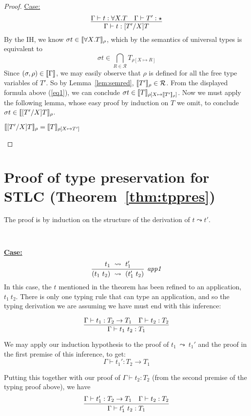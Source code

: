 \documentclass{article}
\providecommand{\apparule}[0]{\infer[\textit{app1}]{(t_1\ t_2)\ \leadsto\ (t_1'\ t_2)}
                                {t_1\ \leadsto\ t_1'}}
\begin{document}
\begin{proof}
\underline{Case:}
\[
\infer{\Gamma \vdash t : [T'/X]T}{\Gamma \vdash t : \forall X.T & \Gamma \vdash T' : \star} 
\]
By the IH, we know $\sigma t\in\llbracket \forall X.T \rrbracket_\rho$, which by the semantics
of universal types is equivalent to
\begin{equation}
\label{eq1}
\sigma t \in \bigcap_{R\in\mathcal{R}} T_{\rho[X\mapsto R]}
\end{equation}
Since $(\sigma,\rho)\in\llbracket \Gamma \rrbracket$, we may easily observe that
$\rho$ is defined for all the free type variables of $T'$.  So by
Lemma~\ref{lem:semred}, $\llbracket T' \rrbracket_\rho\in\mathcal{R}$.  From the
displayed formula above (\ref{eq1}), we can conclude $\sigma t\in
\llbracket T \rrbracket_{\rho[X\mapsto \llbracket T' \rrbracket_\rho]}$.  Now we must apply the
following lemma, whose easy proof by induction on $T$ we omit, to
conclude $\sigma t\in\llbracket [T'/X]T \rrbracket_\rho$.
\begin{lemma}
$\llbracket [T'/X]T \rrbracket_\rho = \llbracket T \rrbracket_{\rho[X\mapsto T']}$
\end{lemma}

\end{proof}




\appendix

\section{Proof of type preservation for STLC (Theorem~\ref{thm:tppres})}
\label{sec:tppres}

The proof is
  by induction on the structure of the derivation of $t \leadsto t'$.  

\ 

\noindent \underline{\textbf{Case:}}
\[
\apparule
\]
\noindent In this case, the $t$ mentioned in the theorem has been
refined to an application, $t_1\ t_2$.  There is only one typing rule that
can type an application, and so the typing derivation we are assuming
we have must end with this inference:

\[
\infer{\Gamma \vdash t_1\ t_2 : T_1}
      {\Gamma \vdash t_1 : T_2 \to T_1 & \Gamma \vdash t_2 : T_2}
\]

\noindent We may apply our induction hypothesis to the proof of $t_1\
\leadsto\ t_1'$ and the proof in the first premise of this inference,
to get:
\[ 
\Gamma \vdash t_1' : T_2\to T_1
\]

\noindent Putting this together with our proof of $\Gamma \vdash t_2 : T_2$
(from the second premise of the typing proof above), we have
\[
\infer{\Gamma \vdash t_1'\ t_2: T_1}
{\Gamma \vdash t_1' : T_2\to T_1 & \Gamma \vdash t_2:T_2}
\]
\end{document}

